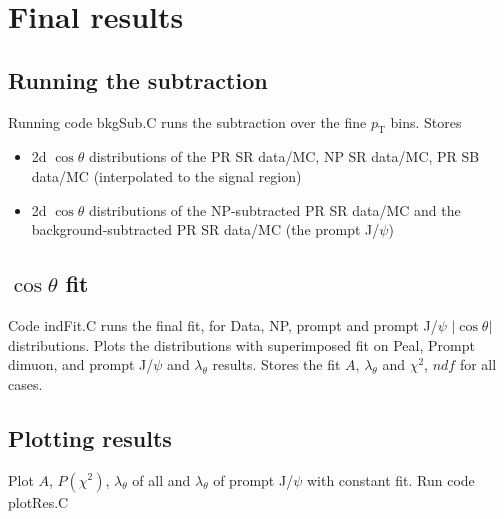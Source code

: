 \documentclass{article}
\newcommand{\pt}{p_\text{T}}
\newcommand{\cost}{\cos\theta}
\begin{document}
\pagebreak

\section{Final results}

\subsection{Running the subtraction}

Running code bkgSub.C runs the subtraction over the fine $\pt$ bins. Stores
\begin{itemize}
\item 2d $\cost$ distributions of the PR SR data/MC, NP SR data/MC, PR SB data/MC (interpolated to the signal region)
\item 2d $\cost$ distributions of the NP-subtracted PR SR data/MC and the background-subtracted PR SR data/MC (the prompt J/$\psi$)
\end{itemize}

\subsection{$\cost$ fit}

Code indFit.C runs the final fit, for  Data, NP, prompt and prompt J/$\psi$ $|\cost|$ distributions. Plots the distributions with superimposed fit on Peal, Prompt dimuon, and prompt J/$\psi$ and $\lambda_\theta$ results. Stores the fit $A$, $\lambda_\theta$ and $\chi^2$, $ndf$ for all cases. 

\subsection{Plotting results}

Plot $A$, $P(\chi^2)$, $\lambda_\theta$ of all and $\lambda_\theta$ of prompt J/$\psi$ with constant fit. Run code plotRes.C
\end{document}
